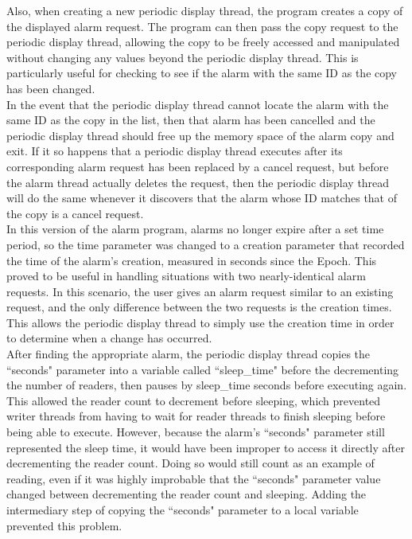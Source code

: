 \documentclass[11pt]{article}
\begin{document}
	Also, when creating a new periodic display thread, the program creates a copy of the displayed alarm request. The program can then pass the copy request to the periodic display thread, allowing the copy to be freely accessed and manipulated without changing any values beyond the periodic display thread. This is particularly useful for checking to see if the alarm with the same ID as the copy has been changed. \\

	In the event that the periodic display thread cannot locate the alarm with the same ID as the copy in the list, then that alarm has been cancelled and the periodic display thread should free up the memory space of the alarm copy and exit. If it so happens that a periodic display thread executes after its corresponding alarm request has been replaced by a cancel request, but before the alarm thread actually deletes the request, then the periodic display thread will do the same whenever it discovers that the alarm whose ID matches that of the copy is a cancel request.\\

	In this version of the alarm program, alarms no longer expire after a set time period, so the time parameter was changed to a creation parameter that recorded the time of the alarm's creation, measured in seconds since the Epoch. This proved to be useful in handling situations with two nearly-identical alarm requests. In this scenario, the user gives an alarm request similar to an existing request, and the only difference between the two requests is the creation times. This allows the periodic display thread to simply use the creation time in order to determine when a change has occurred. \\

	After finding the appropriate alarm, the periodic display thread copies the ``seconds" parameter into a variable called ``sleep\_time" before the decrementing the number of readers, then pauses by sleep\_time seconds before executing again. This allowed the reader count to decrement before sleeping, which prevented writer threads from having to wait for reader threads to finish sleeping before being able to execute. However, because the alarm’s ``seconds" parameter still represented the sleep time, it would have been improper to access it directly after decrementing the reader count. Doing so would still count as an example of reading, even if it was highly improbable that the ``seconds" parameter value changed between decrementing the reader count and sleeping. Adding the intermediary step of copying the ``seconds" parameter to a local variable prevented this problem.
\end{document}
